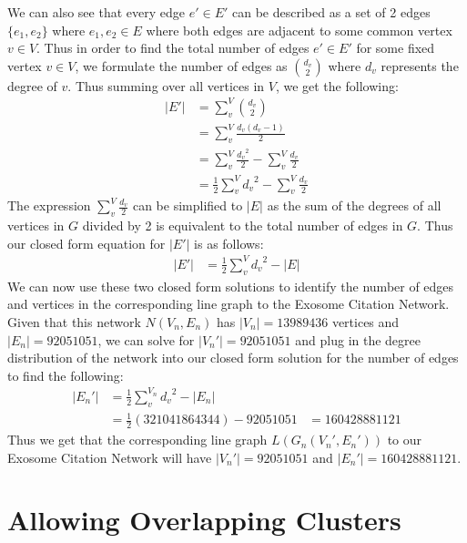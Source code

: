 \documentclass[12pt, oneside]{article}   	%
\begin{document}
We can also see that every edge $e' \in E'$ can be described as a set of 2 edges $\{e_1, e_2\}$ where $e_1,  e_2 \in E$ where both edges are adjacent to some common vertex $v \in V$.  
Thus in order to find the total number of edges $e' \in E'$ for some fixed vertex $v \in V$, we formulate the number of edges as $d_v \choose 2$ where $d_v$ represents the degree of $v$. Thus summing over all vertices in $V$, we get the following:
\begin{equation}
    \begin{aligned}
    |E'| &= \sum^{V}_{v} {d_v \choose 2}\\
    &= \sum^{V}_{v} \frac{d_v(d_v - 1)}{2}\\
    &= \sum^{V}_{v} \frac{{d_v}^2}{2} - \sum^{V}_{v} \frac{d_v}{2}\\
    &= \frac{1}{2}\sum^{V}_{v} {d_v}^2 - \sum^{V}_{v} \frac{d_v}{2}
    \end{aligned}
\end{equation}
The expression $\sum^{V}_{v} \frac{d_v}{2}$ can be simplified to $|E|$ as the sum of the degrees of all vertices in $G$ divided by 2 is equivalent to the total number of edges in $G$. Thus our closed form equation for $|E'|$ is as follows:
\begin{equation}
    \begin{aligned}
    |E'| &= \frac{1}{2}\sum^{V}_{v} {d_v}^2 - |E|
    \end{aligned}
\end{equation}
We can now use these two closed form solutions to identify the number of edges and vertices in the corresponding line graph to the Exosome Citation Network. Given that this network $N(V_n, E_n)$ has $|V_n| = 13989436$ vertices and $|E_n| = 92051051$, we can solve for $|V_n'| = 92051051$ and plug in the degree distribution of the network into our closed form solution for the number of edges to find the following:
\begin{equation}
    \begin{aligned}
    |E_n'| &= \frac{1}{2}\sum^{V_n}_{v} {d_v}^2 - |E_n|\\
    &= \frac{1}{2}(321041864344) - 92051051
    &= 160428881121
    \end{aligned}
\end{equation}
Thus we get that the corresponding line graph $L(G_n(V_n', E_n'))$ to our Exosome Citation Network will have $|V_n'| = 92051051$ and $|E_n'| = 160428881121$. 

\section{Allowing Overlapping Clusters} 
\end{document}

